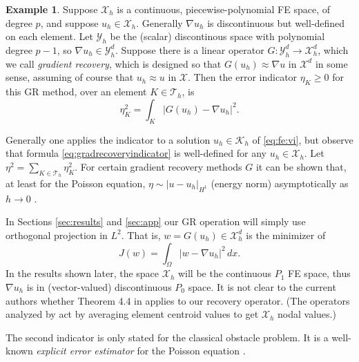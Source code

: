 \documentclass[]{interact}
\theoremstyle{plain}%
\theoremstyle{definition}
\newtheorem{example}[theorem]{Example}
\theoremstyle{remark}
\newcommand{\grad}{\nabla}
\newcommand{\cK}{\mathcal{K}}
\newcommand{\cT}{\mathcal{T}}
\newcommand{\cX}{\mathcal{X}}
\newcommand{\cY}{\mathcal{Y}}
\begin{document}
\begin{example}  \label{example:gradrecovery}  Suppose $\cX_h$ is a continuous, piecewise-polynomial FE space, of degree $p$, and suppose $u_h\in\cX_h$.  Generally $\grad u_h$ is discontinuous but well-defined on each element.  Let $\cY_h$ be the (scalar) discontinous space with polynomial degree $p-1$, so $\grad u_h \in \cY_h^d$.  Suppose there is a linear operator $G : \cY_h^d \to \cX_h^d$, which we call \emph{gradient recovery}, which is designed so that $G(u_h)\approx \grad u$ in $\cX^d$ in some sense, assuming of course that $u_h\approx u$ in $\cX$.  Then the error indicator $\eta_K\ge 0$ for this GR method, over an element $K \in\cT_h$, is
\begin{equation} \label{eq:gradrecoveryindicator}
\eta_K^2 = \int_K \left|G(u_h) - \grad u_h\right|^2.
\end{equation}
\end{example}

Generally one applies the indicator to a solution $u_h \in \cK_h$ of \eqref{eq:fe:vi}, but observe that formula \eqref{eq:gradrecoveryindicator} is well-defined for any $u_h \in \cX_h$.  Let $\eta^2 = \sum_{K\in\cT_h} \eta_K^2$.  For certain gradient recovery methods $G$ it can be shown that, at least for the Poisson equation, $\eta \sim |u-u_h|_{H^1}$ (energy norm) asymptotically as $h\to 0$ \cite[Theorem 4.4]{AinsworthOden2000}.

In Sections \ref{sec:results} and \ref{sec:app} our GR operation will simply use orthogonal projection in $L^2$.  That is, $w = G(u_h) \in \cX_h^d$ is the minimizer of
\begin{equation} \label{eq:gradrecoveryprojection}
J(w) = \int_\Omega |w - \grad u_h|^2\,dx.
\end{equation}
In the results shown later, the space $\cX_h$ will be the continuous $P_1$ FE space, thus $\grad u_h$ is in (vector-valued) discontinuous $P_0$ space.  It is not clear to the current authors whether Theorem 4.4 in \cite{AinsworthOden2000} applies to our recovery operator.  (The operators analyzed by \cite{AinsworthOden2000} act by averaging element centroid values to get $\cX_h$ nodal values.)

The second indicator is only stated for the classical obstacle problem.  It is a well-known \emph{explicit error estimator} for the Poisson equation \cite[Chapter 2]{AinsworthOden2000}.
\end{document}
